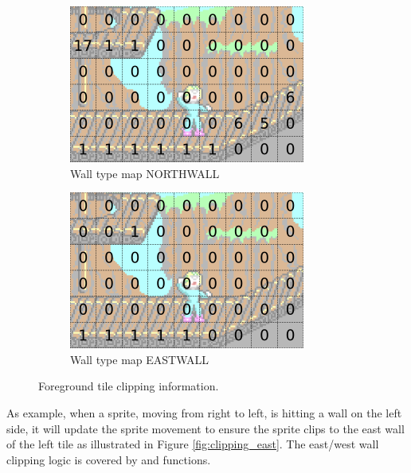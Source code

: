 \documentclass[book.tex]{subfiles}
\begin{document}
\begin{figure}[H]
\centering
\begin{subfigure}{.5\textwidth}
  \centering
  \includegraphics[width=.9\textwidth]{screenshots_300dpi/game/clip_tinf_1.png}
  \caption{Wall type map NORTHWALL}
  \label{fig:clip_tinf_n}
\end{subfigure}%
\begin{subfigure}{.5\textwidth}
  \centering
  \includegraphics[width=.9\textwidth]{screenshots_300dpi/game/clip_tinf_east.png}
  \caption{Wall type map EASTWALL}
  \label{fig:clip_tinf_e}
\end{subfigure}
\caption{Foreground tile clipping information.}
\label{fig:clip_tinf}
\end{figure}

\par
As example, when a sprite, moving from right to left, is hitting a wall on the left side, it will update the sprite movement to ensure the sprite clips to the east wall of the left tile as illustrated in Figure \ref{fig:clipping_east}. The east/west wall clipping logic is covered by  and  functions. \\
\end{document}
